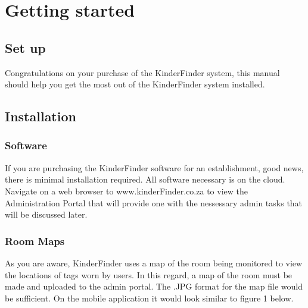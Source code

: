 \documentclass{article}
\begin{document}
\newpage

\section{Getting started}
\subsection{Set up}
Congratulations on your purchase of the KinderFinder system, this manual should help you get the most out of the KinderFinder system installed.

\subsection{Installation}
\subsubsection{Software}
If you are purchasing the KinderFinder software for an establishment, good news, there is minimal installation required.
All software necessary is on the cloud. Navigate on a web browser to www.kinderFinder.co.za to view the Administration Portal that will provide one with the nessessary admin tasks that will be discussed later.

\subsubsection{Room Maps}
As you are aware, KinderFinder uses a map of the room being monitored to view the locations of tags worn by users. In this regard, a map of the room must be made and uploaded to the admin portal. The .JPG format for the map file would be sufficient. On the mobile application it would look similar to figure 1 below.
\end{document}
